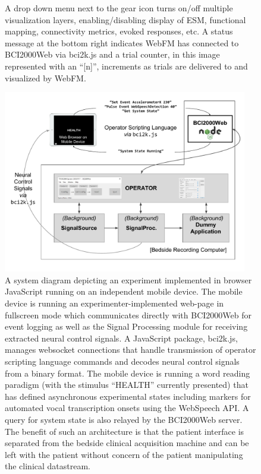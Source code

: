\documentclass[utf8]{frontiersSCNS}
\begin{document}
\begin{figure}[h!]
{A drop down menu next to the gear icon turns on/off multiple visualization layers, enabling/disabling display of ESM, functional mapping, connectivity metrics, evoked responses, etc.  
A status message at the bottom right indicates WebFM has connected to BCI2000Web via bci2k.js and a trial counter, in this image represented with an ``[n]'', increments as trials are delivered to and visualized by WebFM.
}\label{fig:webfm_vis}
\end{figure}

\begin{figure}[h!]
\begin{center}
\includegraphics[width=0.95\textwidth]{figures/f5_web_paradigm}%
\end{center}
\caption{A system diagram depicting an experiment implemented in browser JavaScript running on an independent mobile device.  The mobile device is running an experimenter-implemented web-page in fullscreen mode which communicates directly with BCI2000Web for event logging as well as the Signal Processing module for receiving extracted neural control signals.  A JavaScript package, bci2k.js, manages websocket connections that handle transmission of operator scripting language commands and decodes neural control signals from a binary format.  The mobile device is running a word reading paradigm (with the stimulus “HEALTH” currently presented) that has defined asynchronous experimental states including  markers for automated vocal transcription onsets using the WebSpeech API. A query for system state is also relayed by the BCI2000Web server.  The benefit of such an architecture is that the patient interface is separated from the bedside clinical acquisition machine and can be left with the patient without concern of the patient manipulating the clinical datastream.}\label{fig:web_paradigm}
\end{figure}
\end{document}
